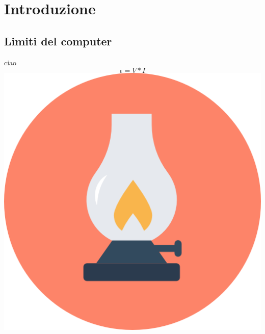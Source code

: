 \newpage
\section{Introduzione}
\subsection{Limiti del computer}
ciao
$$ \epsilon = V * I $$
\includegraphics[scale=0.5]{Immagini/icon.png}
